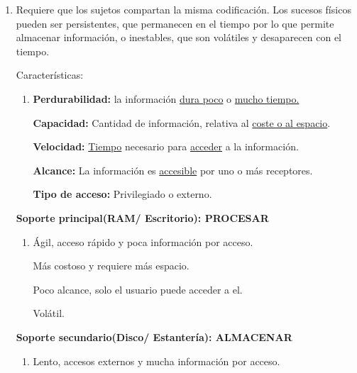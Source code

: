\documentclass[12pt, twoside, openright]{report} %
\begin{document}
  \begin{enumerate}
  \item Requiere que los sujetos compartan la misma codificación. Los
    sucesos físicos pueden ser persistentes, que permanecen en el tiempo
    por lo que permite almacenar información, o inestables, que son
    volátiles y desaparecen con el tiempo.
    

    
    Características:
    

    \begin{enumerate}
    \item \textbf{Perdurabilidad:} la información \underline{dura poco} o
      \underline{mucho tiempo.}
      

      \textbf{Capacidad:} Cantidad de información, relativa al
      \underline{coste o al espacio}.
      

      \textbf{Velocidad:} \underline{Tiempo} necesario para
      \underline{acceder} a la información.
      

      
      \textbf{Alcance:} La información es \underline{accesible} por uno
      o más receptores.
      

      
      \textbf{Tipo de acceso:} Privilegiado o externo.
      
    \end{enumerate}

    
    \textbf{Soporte principal(RAM/ Escritorio): PROCESAR}
    

    \begin{enumerate}
    \item Ágil, acceso rápido y poca información por acceso.
      

      
      Más costoso y requiere más espacio.
      

      
      Poco alcance, solo el usuario puede acceder a el.
      

      
      Volátil.
      
    \end{enumerate}

    
    \textbf{Soporte secundario(Disco/ Estantería): ALMACENAR}
    

    \begin{enumerate}
    \item Lento, accesos externos y mucha información por acceso.
      


\end{enumerate}
\end{enumerate}
\end{document}
